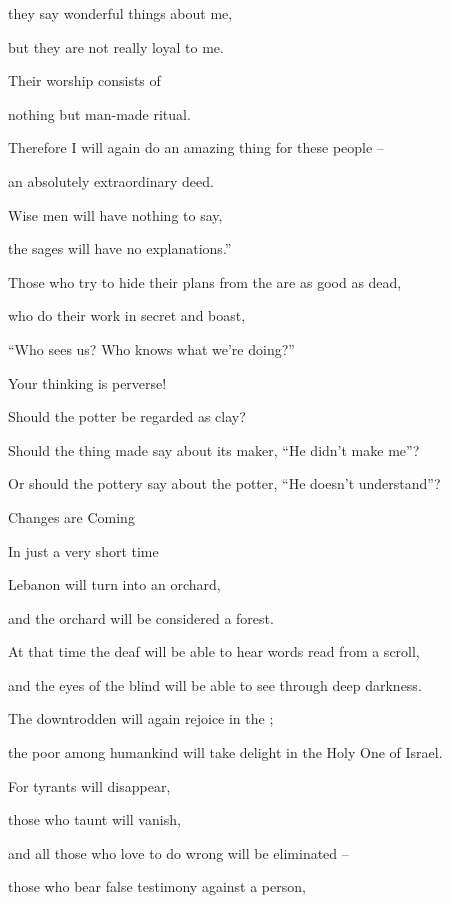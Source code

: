 {\par }{\Q they say
wonderful things
about me,

\par }{\Q but they are not
really loyal
to me.

\par }{\Q Their worship
consists
of
\par }{\Q nothing but man-made
ritual.
\par }{\Q {}Therefore
I
will again
do an amazing thing
for
these
people
–
\par }{\Q an absolutely extraordinary deed.
\par }{\Q Wise men
will have nothing to say,
\par }{\Q the sages
will have no
explanations.”
\par }{\Q {}Those
who try to hide
their plans
from the
{}
are as good as dead,

\par }{\Q who do their work
in secret
and boast,
\par }{\Q “Who
sees
us? Who
knows what we’re doing?”
\par }{\Q {}Your thinking is perverse!

\par }{\Q Should
the potter
be regarded
as clay?

\par }{\Q Should the thing made
say
about its maker,
“He didn’t
make
me”?
\par }{\Q Or should the pottery
say
about the potter,
“He doesn’t
understand”?
\par }{\SH Changes are Coming
\par }{\Q {}In just a very
short time
\par }{\Q Lebanon
will turn into
an orchard,
\par }{\Q and the orchard
will be considered
a forest.
\par }{\Q {}At that time
the deaf
will be able to hear
words
read from a scroll,
\par }{\Q and the eyes
of the blind
will be able to see
through deep
darkness.
\par }{\Q {}The downtrodden
will again
rejoice
in the
{};
\par }{\Q the poor
among humankind
will take delight
in the Holy One
of Israel.
\par }{\Q {}For
tyrants
will disappear,
\par }{\Q those who taunt
will vanish,
\par }{\Q and all
those who love to do
wrong
will be eliminated –
\par }{\Q {}those
who bear false
testimony
against a person,

}
